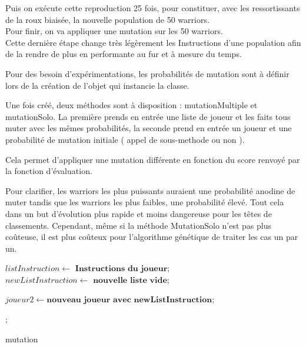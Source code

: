 \documentclass[a4paper,12pt]{article}
\begin{document}
Puis on exécute cette reproduction 25 fois, pour constituer, avec les ressortissants de la roux biaisée, la nouvelle population de 50 warriors.\\
Pour finir, on va appliquer une mutation sur les 50 warriors.\\
Cette dernière étape change très légèrement les Instructions d’une population afin de la rendre de plus en performante au fur et à mesure du temps.

Pour des besoin d'expérimentations, les probabilités de mutation sont à définir lors de la création de l'objet qui instancie la classe. 

Une fois créé, deux méthodes sont à disposition : mutationMultiple et mutationSolo. 
La première prends en entrée une liste de joueur et les faits tous muter avec les mêmes probabilités, la seconde prend en entrée un joueur et une probabilité de mutation initiale ( appel de sous-methode ou non ). 

Cela permet d'appliquer une mutation différente en fonction du score renvoyé par la fonction d'évaluation.

Pour clarifier, les warriors les plus puissants auraient une probabilité anodine de muter tandis que les warriors les plus faibles, une probabilité élevé. Tout cela dans un but d'évolution plus rapide et moins dangereuse pour les têtes de classements.
Cependant, même si la méthode MutationSolo n'est pas plus coûteuse, il est plus coûteux pour l'algorithme génétique de traiter les cas un par un.\\
\begin{algorithm}[H]
\DontPrintSemicolon
{}
$listInstruction \gets \textbf{ Instructions du joueur}$;
$newListInstruction \gets \textbf{ nouvelle liste vide}$;


$joueur2 \gets \textbf{nouveau joueur avec newListInstruction}$;

;
\caption{{\sc mutation}}
\label{algo:mutation} 
\end{algorithm}
\pagebreak
\end{document}
